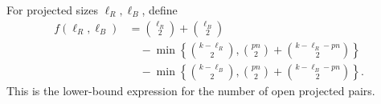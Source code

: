 \begin{definition}
For projected sizes \(\ell_R,\ell_B\), define
\[
\begin{aligned}
f(\ell_R,\ell_B)
&=\binom{\ell_R}{2}+\binom{\ell_B}{2}\\
&\quad-\min\left\{\binom{k-\ell_R}{2},
\binom{pn}{2}+\binom{k-\ell_R-pn}{2}\right\}\\
&\quad-\min\left\{\binom{k-\ell_B}{2},
\binom{pn}{2}+\binom{k-\ell_B-pn}{2}\right\}.
\end{aligned}
\]
This is the lower-bound expression for the number of open projected pairs.
\end{definition}
